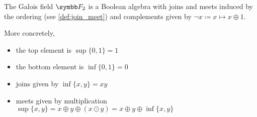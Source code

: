 \begin{theorem}\label{thm:f2_is_boolean_algebra}
  The Galois field \( \Fld_2 \) is a Boolean algebra with joins and meets induced by the ordering (see \cref{def:join_meet}) and complements given by \( \neg x \coloneqq x \mapsto x \oplus 1 \).

  More concretely,
  \begin{itemize}
    \item the top element is \( \sup \{ 0, 1 \} = 1 \)
    \item the bottom element is \( \inf \{ 0, 1 \} = 0 \)
    \item joins given by \( \inf \{ x, y \} = xy \)
    \item meets given by multiplication \( \sup \{ x, y \} = x \oplus y \oplus (x \odot y) = x \oplus y \oplus \inf \{ x, y \} \)
  \end{itemize}
\end{theorem}
